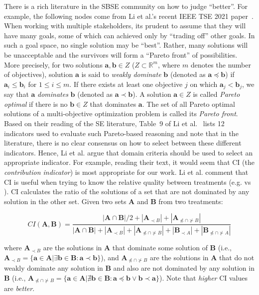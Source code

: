 There is a rich literature in the SBSE
community on how to judge  ``better''.
For example, the following nodes come
from  Li et al.'s recent
IEEE TSE 2021 paper~\cite{li20}. 
 When working with multiple stakeholders, its prudent to assume that they will
 have many goals, some of which can achieved only by ``trading off'' other goals.
In such a goal space, no single solution may be ``best''. Rather, many solutions will be unacceptable
and the survivors will form a ``Pareto front'' of possibilities. 
More precisely, 
for two solutions $\mathbf{a}, \mathbf{b} \in Z$
($Z \subset \mathbb{R}^m$, where $m$ denotes the number of objectives),
solution $\mathbf{a}$ is said to \textit{weakly dominate} $\mathbf{b}$
(denoted as $\mathbf{a}\preceq \mathbf{b}$)
if $\mathbf{a}_i \leq \mathbf{b}_i$ for $1 \leq i \leq m$.
If there exists at least one objective $j$ on which $\mathbf{a}_j < \mathbf{b}_j$,
we say that $\mathbf{a}$ \textit{dominates} $\mathbf{b}$ (denoted as $\mathbf{a}\prec \mathbf{b}$).
A solution $\mathbf{a} \in Z$ is called \textit{Pareto optimal}
if there is no $\mathbf{b} \in Z$ that dominates $\mathbf{a}$.
 The set of all Pareto optimal solutions of a multi-objective optimization problem is called its \textit{Pareto front}.
Based on their reading of the SE
literature, Table~9 of Li et al.~\cite{li20} lists 12   indicators used to evaluate such Pareto-based
reasoning and note that   in the literature, there is no clear consensus on how to select between these different indicators. Hence,
 Li et al. argue that domain criteria should be used to select
an appropriate indicator. 
For example,
reading their text, it would seem that 
  CI (the {\em contribution indicator}) is most appropriate for our work.
Li et al. comment that  CI is useful when trying to know the relative quality between treatments (e.g. {\ITT} vs {\ITTT}).
CI 
calculates the ratio of the solutions of a set that are not dominated by any solution in the other set. 
Given two sets $\mathbf{A}$ and $\mathbf{B}$ from two treatments:

\begin{small}
	\begin{equation}
	CI(\mathbf{A},\mathbf{B}) = \frac{|\mathbf{A}\cap \mathbf{B}|/2 + |\mathbf{A}_{\prec B}| + |\mathbf{A}_{\npreceq \cap \nsucc B}|}{|\mathbf{A}\cap \mathbf{B}| + |\mathbf{A}_{\prec B}| + |\mathbf{A}_{\npreceq \cap \nsucc B}| + |\mathbf{B}_{\prec A}| + |\mathbf{B}_{\npreceq \cap \nsucc A}|}
	\label{eq:CI}
	\end{equation} 
	\end{small}where $\mathbf{A}_{\prec B}$ are the  solutions in $\mathbf{A}$ that dominate some solution of $\mathbf{B}$ (i.e., $\mathbf{A}_{\prec B} = \{\mathbf{a} \in \mathbf{A}| \exists \mathbf{b} \in \mathbf{B}: \mathbf{a} \prec \mathbf{b}\}$), 
	and $\mathbf{A}_{\npreceq \cap \nsucc B}$ are the solutions in $\mathbf{A}$ that do not weakly dominate any solution in $\mathbf{B}$ and also are not dominated by any solution in $\mathbf{B}$ (i.e., $\mathbf{A}_{\npreceq \cap \nsucc B} = \{\mathbf{a} \in \mathbf{A}| \nexists \mathbf{b} \in \mathbf{B}: \mathbf{a} \preceq \mathbf{b} \vee \mathbf{b} \prec \mathbf{a}\}$). Note that {\em higher} CI values
	are {\em better}.
	

